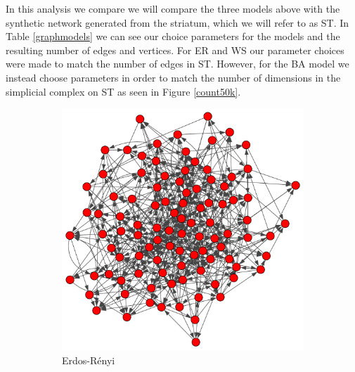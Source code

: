 In this analysis we compare we will compare the three models above with the synthetic network generated from the striatum, which we will refer to as ST. In Table \ref{graphmodels} we can see our choice parameters for the models and the resulting number of edges and vertices. For ER and WS our parameter choices were made to match the number of edges in ST. However, for the BA model we instead choose parameters in order to match the number of dimensions in the simplicial complex on ST as seen in Figure \ref{count50k}.
\begin{figure}[ht]
  \centering
  \begin{subfigure}{.3 \linewidth}
    \includegraphics[scale=0.2]{random_graphs/erdos100v500e.pdf}
    \caption{Erdos-Rényi}
  \end{subfigure}%
  \begin{subfigure}{.3 \linewidth}


\end{subfigure}
\end{figure}

